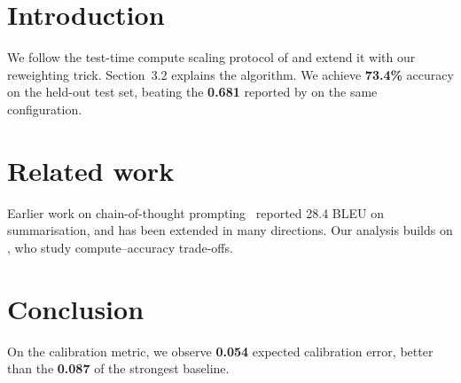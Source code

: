 \documentclass{article}
\begin{document}
\section{Introduction}
We follow the test-time compute scaling protocol of \cite{snell2024scaling} and
extend it with our reweighting trick. Section~3.2 explains the algorithm.
We achieve \textbf{73.4\%} accuracy on the held-out test set, beating the
\textbf{0.681} reported by \cite{ours_method_baseline} on the same configuration.

\section{Related work}
Earlier work on chain-of-thought prompting~\cite{wei2022chain} reported
28.4 BLEU on summarisation, and has been extended in many directions.
Our analysis builds on \cite{snell2024scaling}, who study compute--accuracy
trade-offs.

\section{Conclusion}
On the calibration metric, we observe \textbf{0.054} expected calibration error,
better than the \textbf{0.087} of the strongest baseline.
\end{document}
